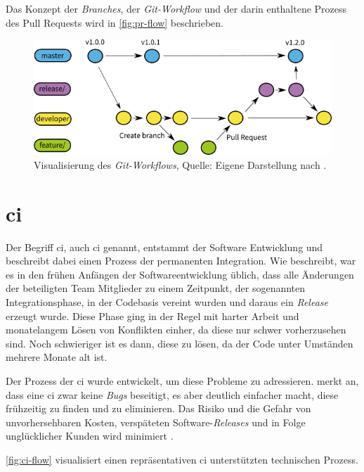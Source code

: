 Das Konzept der \textit{Branches}, der \textit{Git-Workflow} und der darin enthaltene Prozess des Pull Requests wird in \autoref{fig:pr-flow} beschrieben.

\begin{figure}[ht!]
\centering
\includegraphics[width=\textwidth]{source/images/pr-flow}
\caption[Visualisierung des \textit{Git-Workflows}.]{Visualisierung des \textit{Git-Workflows}, Quelle: Eigene Darstellung nach \citealt{contribution_workflow}.}
\label{fig:pr-flow}
\end{figure}


\section{\acf{ci}}

Der Begriff \acl{ci}, auch \ac{ci} genannt, entstammt der Software Entwicklung und beschreibt dabei einen Prozess der permanenten Integration. Wie \citet{jenkins-guide} beschreibt, war es in den frühen Anfängen der Softwareentwicklung üblich, dass alle Änderungen der beteiligten Team Mitglieder zu einem Zeitpunkt, der sogenannten Integrationsphase, in der Codebasis vereint wurden und daraus ein \textit{Release} erzeugt wurde. 
Diese Phase ging in der Regel mit harter Arbeit und monatelangem Lösen von Konflikten einher, da diese nur schwer vorherzusehen sind. Noch schwieriger ist es dann, diese zu lösen, da der Code unter Umständen mehrere Monate alt ist. 

Der Prozess der \ac{ci} wurde entwickelt, um diese Probleme zu adressieren. \citet{fowler_2006} merkt an, dass eine \ac{ci} zwar keine \textit{Bugs} beseitigt, es aber deutlich einfacher macht, diese frühzeitig zu finden und zu eliminieren. 
Das Risiko und die Gefahr von unvorhersehbaren Kosten, verspäteten Software-\textit{Releases} und in Folge unglücklicher Kunden wird minimiert \citep{jenkins-guide}.

\autoref{fig:ci-flow} visualisiert einen repräsentativen \ac{ci} unterstützten technischen Prozess.

